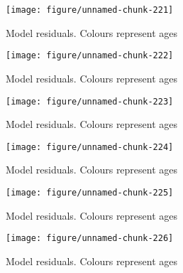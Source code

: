 \documentclass[a4paper]{article}\usepackage{graphicx, color}
\makeatletter
\def\maxwidth{ %
  \ifdim\Gin@nat@width>\linewidth
    \linewidth
  \else
    \Gin@nat@width
  \fi
}
\newenvironment{knitrout}{}{} %
\makeatother
\begin{document}
\begin{knitrout}
\color{fgcolor}\begin{figure}[H]


{\centering \texttt{[image: figure/unnamed-chunk-221]} 

}

\caption[Model residuals]{Model residuals. Colours represent ages\label{fig:unnamed-chunk-221}}
\end{figure}
\begin{figure}[H]


{\centering \texttt{[image: figure/unnamed-chunk-222]} 

}

\caption[Model residuals]{Model residuals. Colours represent ages\label{fig:unnamed-chunk-222}}
\end{figure}
\begin{figure}[H]


{\centering \texttt{[image: figure/unnamed-chunk-223]} 

}

\caption[Model residuals]{Model residuals. Colours represent ages\label{fig:unnamed-chunk-223}}
\end{figure}
\begin{figure}[H]


{\centering \texttt{[image: figure/unnamed-chunk-224]} 

}

\caption[Model residuals]{Model residuals. Colours represent ages\label{fig:unnamed-chunk-224}}
\end{figure}
\begin{figure}[H]


{\centering \texttt{[image: figure/unnamed-chunk-225]} 

}

\caption[Model residuals]{Model residuals. Colours represent ages\label{fig:unnamed-chunk-225}}
\end{figure}
\begin{figure}[H]


{\centering \texttt{[image: figure/unnamed-chunk-226]} 

}

\caption[Model residuals]{Model residuals. Colours represent ages\label{fig:unnamed-chunk-226}}
\end{figure}
\begin{figure}[H]



\end{figure}
\end{knitrout}
\end{document}
